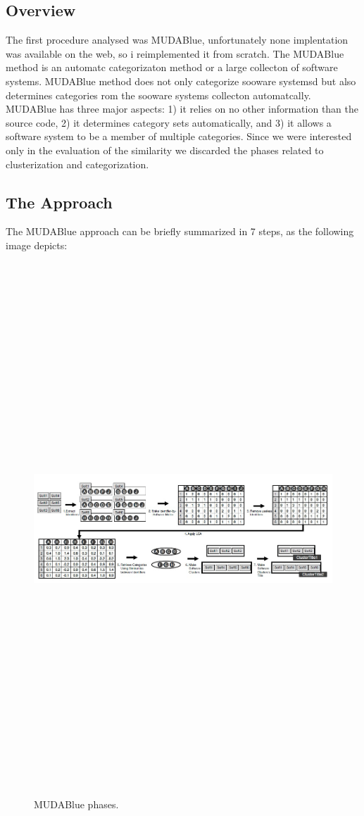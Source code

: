 \subsection{Overview}

The first procedure analysed was MUDABlue, unfortunately none implentation was available on the web, so i reimplemented it from scratch. The MUDABlue method is an automatc categorizaton method or a large collecton of software systems. MUDABlue method does not only categorize sooware systemsd but also determines categories rom the sooware systems collecton automatcally. MUDABlue has three major aspects: 1) it relies on no other information than the source code, 2) it determines category sets automatically, and 3) it allows a software system to be a member of multiple categories. Since we were interested only in the evaluation of the similarity we discarded the phases related to clusterization and categorization.

\subsection{The Approach}

The MUDABlue approach can be briefly summarized in 7 steps, as the following image depicts:

\begin{figure}[H]
\includegraphics[width=15cm,height=20cm,keepaspectratio]{images/Mudablue1.png}
\centering
\caption{MUDABlue phases.}
\end{figure}

